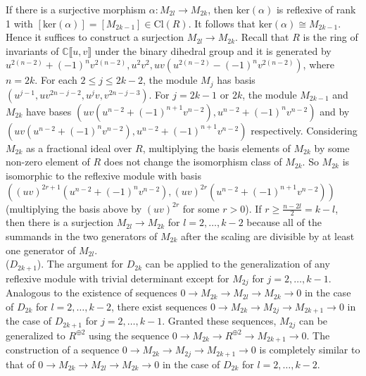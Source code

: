 \documentclass{amsart}[12pt]
\theoremstyle{definition}
\theoremstyle{remark}
\numberwithin{equation}{section}
\begin{document}
If there is a surjective morphism $\alpha: M_{2l} \to M_{2k}$, then $\mathrm{ker} (\alpha)$ is reflexive of rank 1 with $[\mathrm{ker} (\alpha)] = [M_{2k - 1}] \in \mathrm{Cl}(R)$. It follows that $\mathrm{ker} (\alpha) \cong M_{2k - 1}$. Hence it suffices to construct a surjection $M_{2l} \to M_{2k}$. Recall that $R$ is the ring of invariants of $\mathbb{C}\llbracket u, v \rrbracket$ under the binary dihedral group and it is generated by $u^{2(n - 2)} + (-1)^nv^{2(n - 2)}, u^2v^2, uv(u^{2(n - 2)} - (-1)^nv^{2(n - 2)})$, where $n = 2k$. For each $2 \leq j \leq 2k - 2$, the module $M_{j}$ has basis $(u^{j - 1}, uv^{2n - j - 2}, u^jv, v^{2n - j - 3})$. For $j = 2k - 1$ or $2k$, the module $M_{2k - 1}$ and $M_{2k}$ have bases $(uv(u^{n - 2} + (-1)^{n + 1}v^{n - 2}), u^{n - 2} + (-1)^{n}v^{n - 2})$ and by $(uv(u^{n - 2} + (-1)^{n}v^{n - 2}), u^{n - 2} + (-1)^{n + 1}v^{n - 2})$ respectively. Considering $M_{2k}$ as a fractional ideal over $R$, multiplying the basis elements of $M_{2k}$ by some non-zero element of $R$ does not change the isomorphism class of $M_{2k}$. So $M_{2k}$ is isomorphic to the reflexive module with basis $((uv)^{2r + 1}(u^{n - 2} + (-1)^{n}v^{n - 2}), (uv)^{2r}(u^{n - 2} + (-1)^{n + 1}v^{n - 2}))$ (multiplying the basis above by $(uv)^{2r}$ for some $r > 0$). If $r \geq \frac{n - 2l}{2} = k - l$, then there is a surjection $M_{2l} \to M_{2k}$ for $l = 2, \dots, k - 2$ because all of the summands in the two generators of $M_{2k}$ after the scaling are divisible by at least one generator of $M_{2l}$. 
\\

($D_{2k + 1}$). The argument for $D_{2k}$ can be applied to the generalization of any reflexive module with trivial determinant except for $M_{2j}$ for $j = 2, \dots, k - 1$. Analogous to the existence of sequences $0 \to M_{2k} \to M_{2l} \to M_{2k} \to 0$ in the case of $D_{2k}$ for $l = 2, \dots, k - 2$, there exist sequences $0 \to M_{2k} \to M_{2j} \to M_{2k + 1} \to 0$ in the case of $D_{2k + 1}$ for $j = 2, \dots, k - 1$. Granted these sequences, $M_{2j}$ can be generalized to $R^{\oplus 2}$ using the sequence $0 \to M_{2k} \to R^{\oplus 2} \to M_{2k + 1} \to 0$. The construction of a sequence $0 \to M_{2k} \to M_{2j} \to M_{2k + 1} \to 0$ is completely similar to that of $0 \to M_{2k} \to M_{2l} \to M_{2k} \to 0$ in the case of $D_{2k}$ for $l = 2, \dots, k - 2$. 
\\
\end{document}
